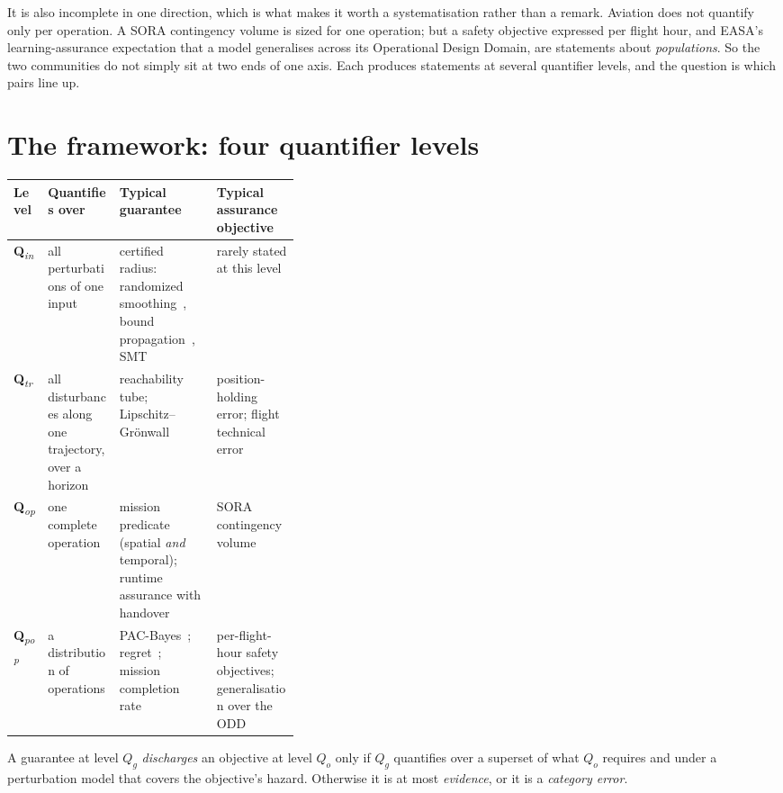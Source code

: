 \documentclass[11pt,a4paper]{article}
\newcommand{\Qlvl}[1]{\textbf{Q}\textsubscript{\textit{#1}}}
\newcommand{\Qin}{\Qlvl{in}}
\newcommand{\Qtr}{\Qlvl{tr}}
\newcommand{\Qop}{\Qlvl{op}}
\newcommand{\Qpop}{\Qlvl{pop}}
\begin{document}
It is also incomplete in one direction, which is what makes it worth a
systematisation rather than a remark. Aviation does not quantify only per
operation. A SORA contingency volume is sized for one operation; but a safety
objective expressed per flight hour, and EASA's learning-assurance expectation
that a model generalises across its Operational Design Domain, are statements
about \emph{populations}. So the two communities do not simply sit at two ends of
one axis. Each produces statements at several quantifier levels, and the
question is which pairs line up.

\section{The framework: four quantifier levels}
\label{sec:framework}
\begin{center}\small
\begin{tabularx}{\linewidth}{@{}P{0.12\linewidth}P{0.25\linewidth}YY@{}}
\toprule
\textbf{Level} & \textbf{Quantifies over} & \textbf{Typical guarantee} &
\textbf{Typical assurance objective} \\
\midrule
\Qin  & all perturbations of one input &
certified radius: randomized smoothing~\cite{cohen2019smoothing}, bound
propagation~\cite{wang2021betacrown}, SMT~\cite{katz2017reluplex} &
rarely stated at this level \\
\Qtr  & all disturbances along one trajectory, over a horizon &
reachability tube; Lipschitz--Gr\"onwall~\cite{gronwall1919} &
position-holding error; flight technical error \\
\Qop  & one complete operation &
mission predicate (spatial \emph{and} temporal); runtime assurance with
handover~\cite{sha2001simplex} &
SORA contingency volume~\cite{jarus_sora25} \\
\Qpop & a distribution of operations &
PAC-Bayes~\cite{mcallester1999pac}; regret~\cite{arora2012mwu}; mission
completion rate & per-flight-hour safety objectives; generalisation over the
ODD~\cite{easa_ai_concept2} \\
\bottomrule
\end{tabularx}
\end{center}

\begin{definition}
A guarantee at level $Q_g$ \emph{discharges} an objective at level $Q_o$ only if
$Q_g$ quantifies over a superset of what $Q_o$ requires and under a perturbation
model that covers the objective's hazard. Otherwise it is at most
\emph{evidence}, or it is a \emph{category error}.
\end{definition}
\end{document}
